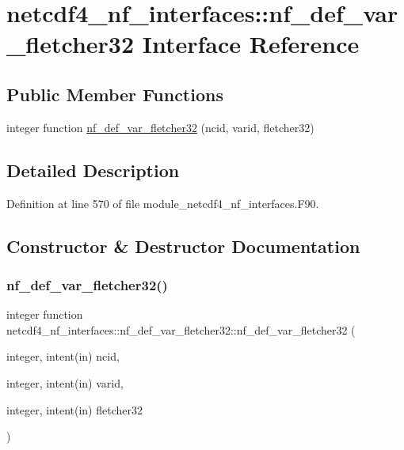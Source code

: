 \hypertarget{interfacenetcdf4__nf__interfaces_1_1nf__def__var__fletcher32}{}\section{netcdf4\+\_\+nf\+\_\+interfaces\+:\+:nf\+\_\+def\+\_\+var\+\_\+fletcher32 Interface Reference}
\label{interfacenetcdf4__nf__interfaces_1_1nf__def__var__fletcher32}
\subsection*{Public Member Functions}
\begin{DoxyCompactItemize}
\item 
integer function \hyperlink{interfacenetcdf4__nf__interfaces_1_1nf__def__var__fletcher32_a5f9ea941658d3f6439d23c683c8f0f40}{nf\+\_\+def\+\_\+var\+\_\+fletcher32} (ncid, varid, fletcher32)
\end{DoxyCompactItemize}


\subsection{Detailed Description}


Definition at line 570 of file module\+\_\+netcdf4\+\_\+nf\+\_\+interfaces.\+F90.



\subsection{Constructor \& Destructor Documentation}
\mbox{\label{interfacenetcdf4__nf__interfaces_1_1nf__def__var__fletcher32_a5f9ea941658d3f6439d23c683c8f0f40}} 
\subsubsection{\texorpdfstring{nf\+\_\+def\+\_\+var\+\_\+fletcher32()}{nf\_def\_var\_fletcher32()}}
{\footnotesize\ttfamily integer function netcdf4\+\_\+nf\+\_\+interfaces\+::nf\+\_\+def\+\_\+var\+\_\+fletcher32\+::nf\+\_\+def\+\_\+var\+\_\+fletcher32 (\begin{DoxyParamCaption}\item[{integer, intent(in)}]{ncid,  }\item[{integer, intent(in)}]{varid,  }\item[{integer, intent(in)}]{fletcher32 }\end{DoxyParamCaption})}



